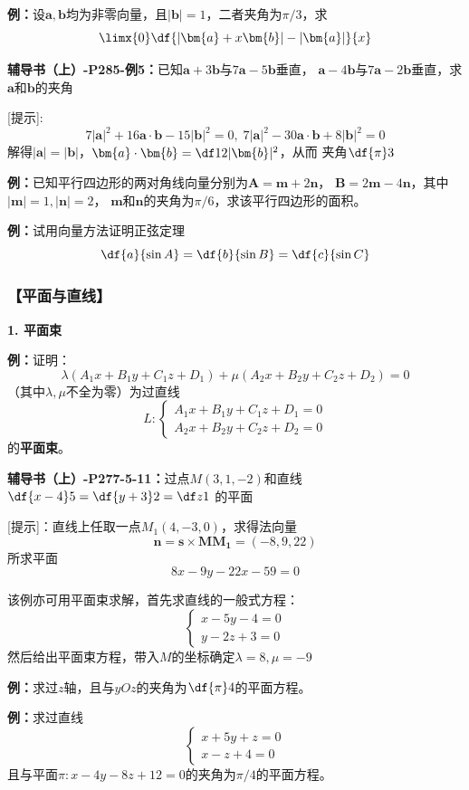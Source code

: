 {\bf 例：}设$\bm{a},\bm{b}$均为非零向量，且$|\bm{b}|=1$，二者夹角为$\pi/3$，求
$$\limx{0}\df{|\bm{a}+x\bm{b}|-|\bm{a}|}{x}$$

{\bf 辅导书（上）-P285-例5：}已知$\bm{a}+3\bm{b}$与$7\bm{a}-5\bm{b}$垂直，
$\bm{a}-4\bm{b}$与$7\bm{a}-2\bm{b}$垂直，求$\bm{a}$和$\bm{b}$的夹角

[提示]:
$$7|\bm{a}|^2+16\bm{a}\cdot\bm{b}-15|\bm{b}|^2=0,\;
7|\bm{a}|^2-30\bm{a}\cdot\bm{b}+8|\bm{b}|^2=0$$
解得$|\bm{a}|=|\bm{b}|$，$\bm{a}\cdot\bm{b}=\df12|\bm{b}|^2$，从而
夹角$\df{\pi}3$

{\bf 例：}已知平行四边形的两对角线向量分别为$\bm{A}=\bm{m}+2\bm{n}$，
$\bm{B}=2\bm{m}-4\bm{n}$，其中$|\bm{m}|=1,|\bm{n}|=2$，
$\bm{m}$和$\bm{n}$的夹角为$\pi/6$，求该平行四边形的面积。

{\bf 例：}试用向量方法证明正弦定理
$$\df{a}{\sin A}=\df{b}{\sin B}=\df{c}{\sin C}$$

\subsubsection{【平面与直线】}

{\bf 1. 平面束}

{\bf 例：}证明：$$\lambda(A_1x+B_1y+C_1z+D_1)+\mu(A_2x+B_2y+C_2z+D_2)=0$$
（其中$\lambda,\mu$不全为零）为过直线
$$L:\left\{\begin{array}{l}
	A_1x+B_1y+C_1z+D_1=0\\
	A_2x+B_2y+C_2z+D_2=0
\end{array}\right.$$
的{\bf 平面束}。

{\bf 辅导书（上）-P277-5-11：}过点$M(3,1,-2)$和直线$\df{x-4}5=\df{y+3}2=\df z1$
的平面

[提示]：直线上任取一点$M_1(4,-3,0)$，求得法向量
$$\bm{n}=\bm{s}\times\bm{MM_1}=(-8,9,22)$$
所求平面
$$8x-9y-22x-59=0$$

该例亦可用平面束求解，首先求直线的一般式方程：
$$\left\{\begin{array}{l}x-5y-4=0\\ y-2z+3=0\end{array}\right.$$
然后给出平面束方程，带入$M$的坐标确定$\lambda=8,\mu=-9$

{\bf 例：}求过$z$轴，且与$yOz$的夹角为$\df{\pi}4$的平面方程。

{\bf 例：}求过直线
$$\left\{\begin{array}{l}
	x+5y+z=0\\
	x-z+4=0
\end{array}\right.$$
且与平面$\pi:x-4y-8z+12=0$的夹角为$\pi/4$的平面方程。

